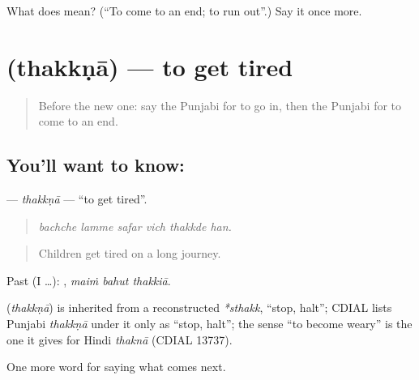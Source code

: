 \begin{tcolorbox}[breakable,colback=teal!4,colframe=teal!35!black,title={Before you move on}]
What does  mean? (\textquotedblleft{}To come to an end; to run out\textquotedblright{}.) Say it once more.
\end{tcolorbox}
\section[\texorpdfstring{\pa{ਥੱਕਣਾ} (thakkṇā)}{ਥੱਕਣਾ (thakkṇā)}]{ (thakkṇā) — to get tired}

\label{lesson:PA-C285-thakkna}



\begin{quote}
Before the new one: say the Punjabi for to go in, then the Punjabi for to come to an end.
\end{quote}

\subsection*{You'll want to know: }
\textbf{} — \emph{thakkṇā} — \textquotedblleft{}to get tired\textquotedblright{}.

\begin{quote}
     
\end{quote}

\begin{quote}
\emph{bachche lamme safar vich thakkde han.}
\end{quote}

\begin{quote}
Children get tired on a long journey.
\end{quote}

Past (I …):   , \emph{maiṁ bahut thakkiā}.

\begin{cousinweb}
\textbf{} (\emph{thakkṇā}) is inherited from a reconstructed \emph{*sthakk}, \textquotedblleft{}stop, halt\textquotedblright{}; CDIAL lists Punjabi \emph{thakkṇā} under it only as \textquotedblleft{}stop, halt\textquotedblright{}; the sense \textquotedblleft{}to become weary\textquotedblright{} is the one it gives for Hindi \emph{thaknā} (CDIAL 13737).
\end{cousinweb}

\begin{grammarlens}[title={What you've built}]
One more word for saying what comes next.
\end{grammarlens}

